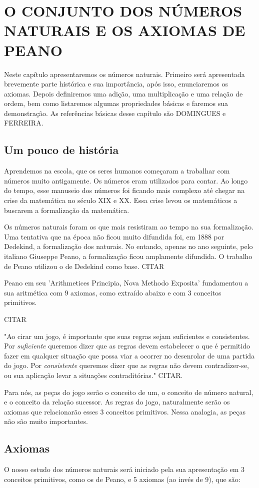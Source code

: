 \documentclass[../main.tex]{subfiles}
\begin{document}
\chapter{O CONJUNTO DOS NÚMEROS NATURAIS E OS AXIOMAS DE PEANO}
Neste capítulo apresentaremos os números naturais. Primeiro será apresentada brevemente parte histórica e sua importância, após isso, enunciaremos os axiomas. Depois definiremos uma adição, uma multiplicação e uma relação de ordem, bem como listaremos algumas propriedades básicas e faremos sua demonstração. As referências básicas desse capítulo são DOMINGUES e FERREIRA.

\section{Um pouco de história}
Aprendemos na escola, que os seres humanos começaram a trabalhar com números muito antigamente. Os números eram utilizados para contar. Ao longo do tempo, esse manuseio dos números foi ficando mais complexo até chegar na crise da matemática no século XIX e XX. Essa crise levou os matemáticos a buscarem a formalização da matemática.

Os números naturais foram os que mais resistiram ao tempo na sua formalização. Uma tentativa que na época não ficou muito difundida foi, em 1888 por Dedekind, a formalização dos naturais. No entando, apenas no ano seguinte, pelo italiano Giuseppe Peano, a formalização ficou amplamente difundida. O trabalho de Peano utilizou o de Dedekind como base. CITAR

Peano em seu 'Arithmetices Principia, Nova Methodo Exposita' fundamentou a sua aritmética com 9 axiomas, como extraído abaixo e com 3 conceitos primitivos.

CITAR

"Ao cirar um jogo, é importante que suas regras sejam suficientes e consistentes. Por \emph{suficiente} queremos dizer que as regras devem estabelecer o que é permitido fazer em qualquer situação que possa viar a ocorrer no desenrolar de uma partida do jogo. Por \emph{consistente} queremos dizer que as regras não devem contradizer-se, ou sua aplicação levar a situações contraditórias." CITAR.

Para nós, as peças do jogo serão o conceito de um, o conceito de número natural, e o conceito da relação sucessor. As regras do jogo, naturalmente serão os axiomas que relacionarão esses 3 conceitos primitivos. Nessa analogia, as peças não são muito importantes.

\section{Axiomas}
O nosso estudo dos números naturais será iniciado pela sua apresentação em 3 conceitos primitivos, como os de Peano, e 5 axiomas (ao invés de 9), que são:
\end{document}
